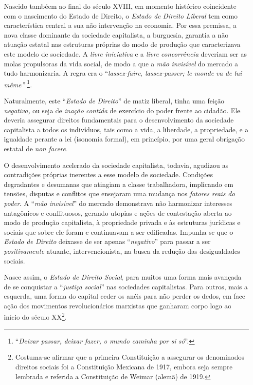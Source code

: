 Nascido tambéem ao final do século XVIII, em momento histórico
coincidente com o nascimento do Estado de Direito, o \emph{Estado de
Direito Liberal} tem como característica central a sua não intervenção
na economia. Por essa premissa, a nova classe dominante da sociedade
capitalista, a burguesia, garantia a não atuação estatal nas estruturas
próprias do modo de produção que caracterizava este modelo de sociedade.
A \emph{livre iniciativa} e a \emph{livre concorrência} deveriam ser as
molas propulsoras da vida social, de modo a que a \emph{mão invisível}
do mercado a tudo harmonizaria. A regra era o ``\emph{lassez-faire,
lassez-passer; le monde va de lui même''} \footnote{``\emph{Deixar
  passar, deixar fazer, o mundo caminha por si só}''.}\emph{.}

Naturalmente, este ``\emph{Estado de Direito}'' de matiz liberal, tinha
uma feição \emph{negativa,} ou seja de \emph{inação contida} de
exercício do poder frente ao cidadão. Ele deveria assegurar direitos
fundamentais para o desenvolvimento da sociedade capitalista a todos os
indivíduos, tais como a vida, a liberdade, a propriedade, e a igualdade
perante a lei (isonomia formal), em princípio, por uma geral obrigação
estatal de \emph{non facere.}

O desenvolvimento acelerado da sociedade capitalista, todavia, agudizou
as contradições próprias inerentes a esse modelo de sociedade. Condições
degradantes e desumanas que atingiam a classe trabalhadora, implicando
em tensões, disputas e conflitos que ensejaram uma mudança nos
\emph{fatores reais do poder}. A ``\emph{mão invisível}'' do mercado
demonstrava não harmonizar interesses antagônicos e conflituosos,
gerando utopias e ações de contestação aberta ao modo de produção
capitalista, à propriedade privada e às estruturas jurídicas e sociais
que sobre ele foram e continuavam a ser edificadas. Impunha-se que o
\emph{Estado de Direito} deixasse de ser apenas ``\emph{negativo}'' para
passar a ser \emph{positivamente} atuante, intervencionista, na busca da
redução das desigualdades sociais.

Nasce assim, o \emph{Estado de Direito Social}, para muitos uma forma
mais avançada de se conquistar a ``\emph{justiça social}'' nas
sociedades capitalistas. Para outros, mais a esquerda, uma forma do
capital ceder os anéis para não perder os dedos, em face ação dos
movimentos revolucionários marxistas que ganharam corpo logo ao início
do século XX\footnote{Costuma-se afirmar que a primeira Constituição a
  assegurar os denominados direitos sociais foi a Constituição Mexicana
  de 1917, embora seja sempre lembrada e referida a Constituição de
  Weimar (alemã) de 1919.}.

